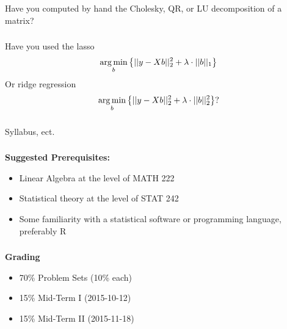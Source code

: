 \begin{frame}[fragile] \frametitle{}

Have you computed by hand the Cholesky, QR, or LU decomposition of a matrix?

\end{frame}

\begin{frame}[fragile] \frametitle{}

Have you used the lasso
\begin{align*}
\mathop{\mathrm{arg\,min}}_b \left\{ || y - X b ||_2^2 + \lambda \cdot ||b||_1 \right\}
\end{align*}
\pause Or ridge regression
\begin{align*}
\mathop{\mathrm{arg\,min}}_b \left\{ || y - X b ||_2^2 + \lambda \cdot ||b||_2^2 \right\}?
\end{align*}

\end{frame}

\begin{frame}[fragile] \frametitle{}

\begin{flushright}
{\color{yaleblue}\sc\fontsize{1cm}{0cm}\selectfont Syllabus, ect.}
\end{flushright}

\end{frame}

\begin{frame}[fragile] \frametitle{}

{\bf Suggested Prerequisites:} \pause
\begin{itemize}\setlength\itemsep{0em}
\item Linear Algebra at the level of MATH 222 \pause
\item Statistical theory at the level of STAT 242 \pause
\item Some familiarity with a statistical software or programming language, preferably R
\end{itemize}

\end{frame}


\begin{frame}[fragile] \frametitle{}

{\bf Grading}

\begin{itemize}\setlength\itemsep{0em}
\item 70\% Problem Sets (10\% each) \pause
\item 15\% Mid-Term I (2015-10-12) \pause
\item 15\% Mid-Term II (2015-11-18)
\end{itemize}

\end{frame}


